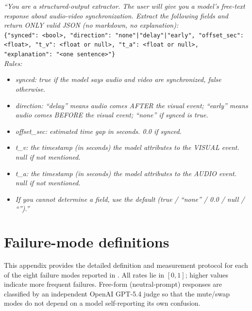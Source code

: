 \begin{tcolorbox}[judgebox,title={\textsc{Shift} \textemdash{} Judge System Prompt}]
\textit{``You are a structured-output extractor. The user will give you a
model's free-text response about audio-video synchronization. Extract the
following fields and return ONLY valid JSON (no markdown, no explanation):}
\\[2pt]
\texttt{\{"synced": <bool>, "direction": "none"|"delay"|"early",
"offset\_sec": <float>, "t\_v": <float or null>, "t\_a": <float or null>,
"explanation": "<one sentence>"\}}\\[2pt]
\textit{Rules:}
\begin{itemize}\itemsep0pt
  \item \textit{synced: true if the model says audio and video are
        synchronized, false otherwise.}
  \item \textit{direction: ``delay'' means audio comes AFTER the visual
        event; ``early'' means audio comes BEFORE the visual event; ``none''
        if synced is true.}
  \item \textit{offset\_sec: estimated time gap in seconds. 0.0 if synced.}
  \item \textit{t\_v: the timestamp (in seconds) the model attributes to
        the VISUAL event. null if not mentioned.}
  \item \textit{t\_a: the timestamp (in seconds) the model attributes to
        the AUDIO event. null if not mentioned.}
  \item \textit{If you cannot determine a field, use the default (true /
        ``none'' / 0.0 / null / ``'').''}
\end{itemize}
\end{tcolorbox}



\section{Failure-mode definitions}
\label{app:failure-modes}

This appendix provides the detailed definition and measurement protocol for
each of the eight failure modes reported in
. All rates lie in $[0,1]$; higher values
indicate more frequent failures. Free-form (neutral-prompt) responses are
classified by an independent OpenAI GPT-5.4 judge so that the mute/swap modes
do not depend on a model self-reporting its own confusion.

